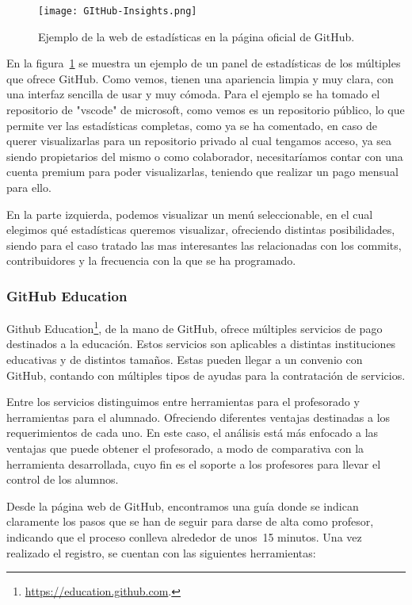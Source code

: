 \begin{figure}[h!]
  \texttt{[image: GItHub-Insights.png]}
  \caption{Ejemplo de la web de estadísticas en la página oficial de
    GitHub.}
  \label{figure:GithubInsights}
\end{figure}

En la figura~\ref{figure:GithubInsights} se muestra un ejemplo de un panel
de estadísticas de los múltiples que ofrece GitHub. Como vemos, tienen una
apariencia limpia y muy clara, con una interfaz sencilla de usar y muy
cómoda. Para el ejemplo se ha tomado el repositorio de "vscode" de
microsoft, como vemos es un repositorio público, lo que permite ver las
estadísticas completas, como ya se ha comentado, en caso de querer
visualizarlas para un repositorio privado al cual tengamos acceso, ya sea
siendo propietarios del mismo o como colaborador, necesitaríamos contar con
una cuenta premium para poder visualizarlas, teniendo que realizar un pago
mensual para ello.

En la parte izquierda, podemos visualizar un menú seleccionable, en el cual
elegimos qué estadísticas queremos visualizar, ofreciendo distintas
posibilidades, siendo para el caso tratado las mas interesantes las
relacionadas con los commits, contribuidores y la frecuencia con la que se
ha programado.

\subsubsection{GitHub Education}

Github Education\footnote{\url{https://education.github.com}.}, de la mano
de GitHub, ofrece múltiples servicios de pago destinados a la
educación. Estos servicios son aplicables a distintas instituciones
educativas y de distintos tamaños. Estas pueden llegar a un convenio con
GitHub, contando con múltiples tipos de ayudas para la contratación de
servicios.

Entre los servicios distinguimos entre herramientas para el profesorado y
herramientas para el alumnado. Ofreciendo diferentes ventajas destinadas a
los requerimientos de cada uno. En este caso, el análisis está más enfocado
a las ventajas que puede obtener el profesorado, a modo de comparativa con
la herramienta desarrollada, cuyo fin es el soporte a los profesores para
llevar el control de los alumnos.

Desde la página web de GitHub,
encontramos una guía donde se indican claramente los pasos que se han de
seguir para darse de alta como profesor, indicando que el proceso conlleva
alrededor de unos~15 minutos. Una vez realizado el registro, se cuentan con
las siguientes herramientas:

